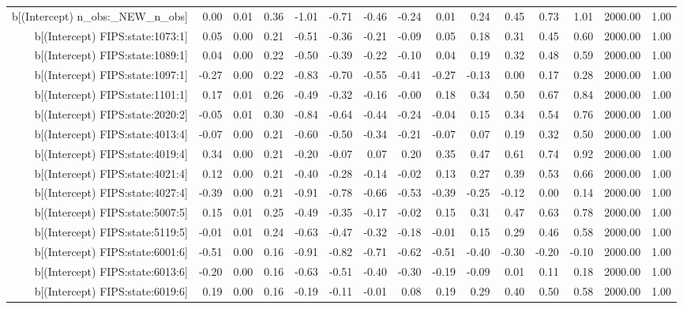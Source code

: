 \begin{table}[ht]
\begin{tabular}{rrrrrrrrrrrrrrr}
  b[(Intercept) n\_obs:\_NEW\_n\_obs] & 0.00 & 0.01 & 0.36 & -1.01 & -0.71 & -0.46 & -0.24 & 0.01 & 0.24 & 0.45 & 0.73 & 1.01 & 2000.00 & 1.00 \\ 
  b[(Intercept) FIPS:state:1073:1] & 0.05 & 0.00 & 0.21 & -0.51 & -0.36 & -0.21 & -0.09 & 0.05 & 0.18 & 0.31 & 0.45 & 0.60 & 2000.00 & 1.00 \\ 
  b[(Intercept) FIPS:state:1089:1] & 0.04 & 0.00 & 0.22 & -0.50 & -0.39 & -0.22 & -0.10 & 0.04 & 0.19 & 0.32 & 0.48 & 0.59 & 2000.00 & 1.00 \\ 
  b[(Intercept) FIPS:state:1097:1] & -0.27 & 0.00 & 0.22 & -0.83 & -0.70 & -0.55 & -0.41 & -0.27 & -0.13 & 0.00 & 0.17 & 0.28 & 2000.00 & 1.00 \\ 
  b[(Intercept) FIPS:state:1101:1] & 0.17 & 0.01 & 0.26 & -0.49 & -0.32 & -0.16 & -0.00 & 0.18 & 0.34 & 0.50 & 0.67 & 0.84 & 2000.00 & 1.00 \\ 
  b[(Intercept) FIPS:state:2020:2] & -0.05 & 0.01 & 0.30 & -0.84 & -0.64 & -0.44 & -0.24 & -0.04 & 0.15 & 0.34 & 0.54 & 0.76 & 2000.00 & 1.00 \\ 
  b[(Intercept) FIPS:state:4013:4] & -0.07 & 0.00 & 0.21 & -0.60 & -0.50 & -0.34 & -0.21 & -0.07 & 0.07 & 0.19 & 0.32 & 0.50 & 2000.00 & 1.00 \\ 
  b[(Intercept) FIPS:state:4019:4] & 0.34 & 0.00 & 0.21 & -0.20 & -0.07 & 0.07 & 0.20 & 0.35 & 0.47 & 0.61 & 0.74 & 0.92 & 2000.00 & 1.00 \\ 
  b[(Intercept) FIPS:state:4021:4] & 0.12 & 0.00 & 0.21 & -0.40 & -0.28 & -0.14 & -0.02 & 0.13 & 0.27 & 0.39 & 0.53 & 0.66 & 2000.00 & 1.00 \\ 
  b[(Intercept) FIPS:state:4027:4] & -0.39 & 0.00 & 0.21 & -0.91 & -0.78 & -0.66 & -0.53 & -0.39 & -0.25 & -0.12 & 0.00 & 0.14 & 2000.00 & 1.00 \\ 
  b[(Intercept) FIPS:state:5007:5] & 0.15 & 0.01 & 0.25 & -0.49 & -0.35 & -0.17 & -0.02 & 0.15 & 0.31 & 0.47 & 0.63 & 0.78 & 2000.00 & 1.00 \\ 
  b[(Intercept) FIPS:state:5119:5] & -0.01 & 0.01 & 0.24 & -0.63 & -0.47 & -0.32 & -0.18 & -0.01 & 0.15 & 0.29 & 0.46 & 0.58 & 2000.00 & 1.00 \\ 
  b[(Intercept) FIPS:state:6001:6] & -0.51 & 0.00 & 0.16 & -0.91 & -0.82 & -0.71 & -0.62 & -0.51 & -0.40 & -0.30 & -0.20 & -0.10 & 2000.00 & 1.00 \\ 
  b[(Intercept) FIPS:state:6013:6] & -0.20 & 0.00 & 0.16 & -0.63 & -0.51 & -0.40 & -0.30 & -0.19 & -0.09 & 0.01 & 0.11 & 0.18 & 2000.00 & 1.00 \\ 
  b[(Intercept) FIPS:state:6019:6] & 0.19 & 0.00 & 0.16 & -0.19 & -0.11 & -0.01 & 0.08 & 0.19 & 0.29 & 0.40 & 0.50 & 0.58 & 2000.00 & 1.00 \\ 

\end{tabular}
\end{table}
